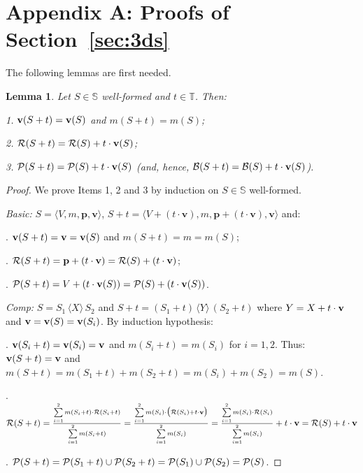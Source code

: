 \documentclass[11pt]{article}
\newcommand{\shapes}{\mathbb{S}}
\newcommand{\vect}[1]{\mathbf{#1}}
\newcommand{\union}[1]{\ensuremath{\,\langle #1 \rangle\,}}
\newcommand{\boundary}[1]{\ensuremath{{\cal B}(#1)}}
\newcommand{\points}[1]{\ensuremath{{\cal P}(#1)}}
\newcommand{\velocity}[1]{{\bf v}(#1)}
\newcommand{\mass}[1]{m(#1)}
\newcommand{\referencepoint}[1]{\ensuremath{{\cal R}(#1)}}
\newcommand{\timedomain}{{\mathbb T}}
\newtheorem{lemma}{Lemma}
\begin{document}
\section*{Appendix A: Proofs of Section~\ref{sec:3ds}}
The following lemmas are first needed.
\begin{lemma}\label{lemma:shape-properties1}
Let $S \in \shapes$ well-formed and $t \in \timedomain$. Then:

1. $\velocity{S+t} = \velocity{S}$ and $\mass{S+t} = \mass{S}$;

2. $\referencepoint{S+t} = \referencepoint{S} + t \cdot \velocity{S}$;

3. $\points{S+t} = \points{S} + t \cdot \velocity{S}$ (and, hence, $\boundary{S+t} = \boundary{S}
+ t \cdot \velocity{S}$).
\end{lemma}
\begin{proof}
We prove Items 1, 2 and 3 by induction on $S \in \shapes$ well-formed.

\smallskip \noindent 
{\em Basic:} $S= \langle V, m, \vect{p}, \vect{v} \rangle $, $S+t = \langle V + (t \cdot \vect{v}),
m, \vect{p} + (t \cdot \vect{v}), \vect{v} \rangle$ and:
 
. $\velocity{S+t} = \vect{v} = \velocity{S}$ and $\mass{S+t} = m = \mass{S}$;

. $\referencepoint{S+t} = \vect{p} + (t \cdot \vect{v}) = \referencepoint{S} + (t \cdot
\vect{v})$;

. $\points{S+t} = V + (t \cdot \velocity{S})  = \points{S} + (t \cdot \velocity{S})$.

\par\medskip\noindent
{\em Comp:} $S= S_1 \union{X} S_2$ and $S+t = (S_1 +t) \union{Y} (S_2+t)$ where $Y = X + t
\cdot {\bf v}$ and ${\bf v} = \velocity{S} = \velocity{S_i}$. By induction hypothesis:

\par\medskip{}. $\velocity{S_i+t}= \velocity{S_i}= {\bf v}$ and $\mass{S_i+t} = \mass{S_i}$
for $i=1,2$.
Thus: $\velocity{S+t}= {\bf v}$ and $\mass{S+t} = \mass{S_1+t} + \mass{S_2+t} = \mass{S_i} +
\mass{S_2} = \mass{S}$.

\par\medskip{}.  $\referencepoint{S+t} = \frac{\sum\limits_{i=1}^2 \mass{S_i + t} \cdot
\referencepoint{S_i + t}} {\sum\limits_{i=1}^2 \mass{S_i + t}}
= \frac{\sum\limits_{i=1}^2 \mass{S_i} \cdot \big(\referencepoint{S_i } + t \cdot \vect{v} \big)}
{\sum\limits_{i=1}^2 \mass{S_i}}
= \frac{\sum\limits_{i=1}^2 \mass{S_i} \cdot \referencepoint{S_i } } {\sum\limits_{i=1}^2
\mass{S_i}} +  \\ t \cdot \vect{v} = \referencepoint{S} +  t \cdot \vect{v}$

\vspace*{0.2cm}

. $\points{S+t} = \points{S_1 +t} \cup \points{S_2 +t} = \points{S_1} \cup
\points{S_2}=\points{S}$.

\end{proof}
\end{document}
